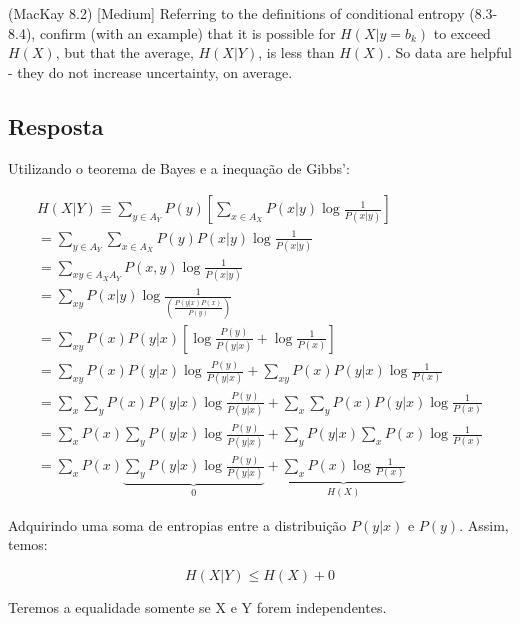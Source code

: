 (MacKay 8.2) [Medium]
Referring to the definitions of conditional entropy (8.3-8.4), confirm (with an example) that it is possible for $H( X | y = b_k )$ to exceed $H(X)$, but that the average, $H(X|Y)$, is less than $H(X)$. So data are helpful - they do not increase uncertainty, on average.

\subsection*{Resposta}

Utilizando o teorema de Bayes e a inequação de Gibbs':

\[\begin{array}{l}
\displaystyle H(X|Y) \equiv \sum\limits_{y \in {A_Y}} {P(y)\left[ {\sum\limits_{x \in {A_X}} {P(x|y)\log \frac{1}{{P(x|y)}}} } \right]} \\
\displaystyle = \sum\limits_{y \in {A_Y}} {\sum\limits_{x \in {A_X}} {P(y)P(x|y)\log \frac{1}{{P(x|y)}}} } \\
\displaystyle = \sum\limits_{xy \in {A_X}{A_Y}} {P(x,y)\log \frac{1}{{P(x|y)}}} \\
\displaystyle = \sum\limits_{xy} {P(x|y)\log \frac{1}{{\left( {\frac{{P(y|x)P(x)}}{{P(y)}}} \right)}}} \\
\displaystyle = \sum\limits_{xy} {P(x)P(y|x)\left[ {\log \frac{{P(y)}}{{P(y|x)}} + \log \frac{1}{{P(x)}}} \right]} \\
\displaystyle = \sum\limits_{xy} {P(x)P(y|x)\log \frac{{P(y)}}{{P(y|x)}}}  + \sum\limits_{xy} {P(x)P(y|x)\log \frac{1}{{P(x)}}} \\
\displaystyle = \sum\limits_x {\sum\limits_y {P(x)P(y|x)\log \frac{{P(y)}}{{P(y|x)}}} }  + \sum\limits_x {\sum\limits_y {P(x)P(y|x)\log \frac{1}{{P(x)}}} } \\
\displaystyle = \sum\limits_x {P(x)\sum\limits_y {P(y|x)\log \frac{{P(y)}}{{P(y|x)}}} }  + \sum\limits_y {P(y|x)\sum\limits_x {P(x)\log \frac{1}{{P(x)}}} } \\
\displaystyle = \sum\limits_x {P(x)\underbrace {\sum\limits_y {P(y|x)\log \frac{{P(y)}}{{P(y|x)}}} }_0}  + \underbrace {\sum\limits_x {P(x)\log \frac{1}{{P(x)}}} }_{H(X)}
\end{array}\]

Adquirindo uma soma de entropias entre a distribuição $P(y|x)$ e $P(y)$. Assim, temos:

\[H(X|Y) \le H(X) + 0\]

Teremos a equalidade somente se X e Y forem independentes.
